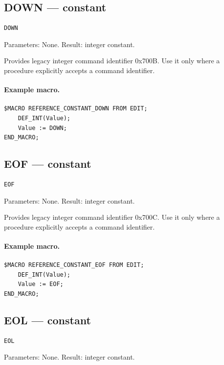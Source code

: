 \documentclass[a4paper,10pt,twoside,openany]{book}
\begin{document}
\label{prim:constant-down}
\subsection*{DOWN --- constant}
\begin{verbatim}
DOWN
\end{verbatim}
Parameters: None. Result: integer constant.

Provides legacy integer command identifier 0x700B. Use it only where a procedure explicitly accepts a command identifier.

\paragraph{Example macro.}
\begin{verbatim}
$MACRO REFERENCE_CONSTANT_DOWN FROM EDIT;
    DEF_INT(Value);
    Value := DOWN;
END_MACRO;
\end{verbatim}

\label{prim:constant-eof}
\subsection*{EOF --- constant}
\begin{verbatim}
EOF
\end{verbatim}
Parameters: None. Result: integer constant.

Provides legacy integer command identifier 0x700C. Use it only where a procedure explicitly accepts a command identifier.

\paragraph{Example macro.}
\begin{verbatim}
$MACRO REFERENCE_CONSTANT_EOF FROM EDIT;
    DEF_INT(Value);
    Value := EOF;
END_MACRO;
\end{verbatim}

\label{prim:constant-eol}
\subsection*{EOL --- constant}
\begin{verbatim}
EOL
\end{verbatim}
Parameters: None. Result: integer constant.
\end{document}

